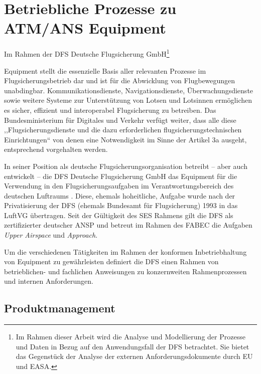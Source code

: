 \chapter{Betriebliche Prozesse zu ATM/ANS Equipment}

\begin{center}
    \footnotesize
    Im Rahmen der DFS Deutsche Flugsicherung GmbH\footnote{Im Rahmen dieser Arbeit wird die Analyse und Modellierung der Prozesse und Daten in Bezug auf den Anwendungsfall der DFS betrachtet. Sie bietet das Gegenstück der Analyse der externen Anforderungsdokumente durch EU und EASA.}
\end{center}

\noindent
\atmans Equipment stellt die essenzielle Basis aller relevanten Prozesse im Flugsicherungsbetrieb dar und ist für die Abwicklung von Flugbewegungen unabdingbar. 
Kommunikationsdienste, Navigationsdienste, Überwachungsdienste sowie weitere Systeme zur Unterstützung von Lotsen und Lotsinnen ermöglichen es sicher, effizient und interoperabel Flugsicherung zu betreiben.
Das Bundesministerium für Digitales und Verkehr verfügt weiter, dass alle diese ,,Flugsicherungsdienste und die dazu erforderlichen flugsicherungstechnischen Einrichtungen`` von denen eine Notwendigkeit im Sinne der  Artikel 3a ausgeht, entsprechend vorgehalten werden.
\cite[§27 d]{luftvg}

In seiner Position als deutsche Flugsicherungsorganisation betreibt -- aber auch entwickelt -- die DFS Deutsche Flugsicherung GmbH das \atmans Equipment für die Verwendung in den Flugsicherungsaufgaben im Verantwortungsbereich des deutschen Luftraums 
\cite[§27 c]{luftvg}.
Diese, ehemals hoheitliche, Aufgabe wurde nach der Privatisierung der \ac{DFS} (ehemals Bundesamt für Flugsicherung) 1993 in das \ac{LuftVG} übertragen.
Seit der Gültigkeit des \ac{SES} Rahmens gilt die \ac{DFS} als zertifizierter deutscher \acf{ANSP} und betreut im Rahmen des \ac{FABEC} die Aufgaben \textit{Upper Airspace} und \textit{Approach}. 

Um die verschiedenen Tätigkeiten im Rahmen der konformen Inbetriebhaltung von \atmans Equipment zu gewährleisten definiert die \ac{DFS} einen Rahmen von betrieblichen- und fachlichen Anweisungen zu konzernweiten Rahmenprozessen und internen Anforderungen. \cite{fa_freigaben,ba_technik}   

    \section{Produktmanagement}



